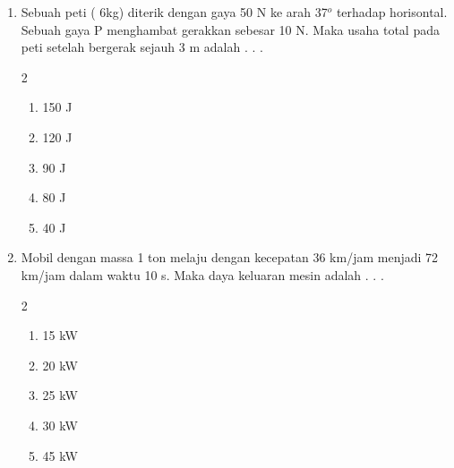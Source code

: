 \documentclass[11pt,a4paper]{article}
\newcommand{\pilgani}[1]{                            \vspace{-0.3cm}\begin{multicols}{2}
 \begin{enumerate}[label=\Alph*., itemsep=0pt,topsep=0pt,leftmargin=*,align=Center]#1                     \end{enumerate}
 \phantom{ini cuma sapi, wedus, dan ayam}
 \end{multicols}}
\begin{document}
\begin{enumerate}
\item Sebuah peti ( 6kg) diterik dengan gaya 50 N ke arah 37$^o$ terhadap horisontal. Sebuah gaya P menghambat gerakkan sebesar 10 N. Maka usaha total pada peti setelah bergerak sejauh 3 m adalah . . . 
\pilgani{
	\item 150 J
	\item 120 J
	\item 90 J
	\item 80 J
	\item 40 J } \vspace{2cm}
	
\item Mobil dengan massa 1 ton melaju dengan kecepatan 36 km/jam menjadi 72 km/jam dalam waktu 10 s. Maka daya keluaran mesin adalah . . .
\pilgani{
	\item 15 kW
	\item 20 kW
	\item 25 kW
	\item 30 kW
	\item 45 kW } \vspace{2cm}
	



\end{enumerate}
\end{document}
